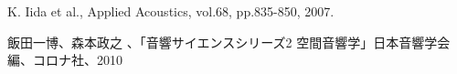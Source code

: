 \documentclass[autodetect-engine,dvi=dvipdfmx,ja=standard,twocolumn,jbase=13.35Q]{bxjsarticle}
\begin{document}

\begin{thebibliography}{9}%
K. Iida et al., Applied Acoustics, vol.68, pp.835-850, 2007.

飯田一博、森本政之 、「音響サイエンスシリーズ2 空間音響学」日本音響学会編、コロナ社、2010
\end{thebibliography}
\end{document}
